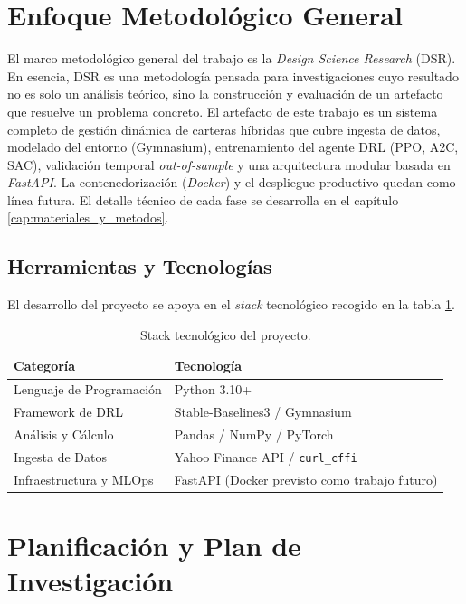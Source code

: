 \documentclass[IB,a4paper]{TFUOC}
\begin{document}

\section{Enfoque Metodológico General}
\label{sec:enfoque_metodologico}

El marco metodológico general del trabajo es la \textit{Design Science Research} (DSR). En esencia, DSR es una metodología pensada para investigaciones cuyo resultado no es solo un análisis teórico, sino la construcción y evaluación de un artefacto que resuelve un problema concreto. El artefacto de este trabajo es un sistema completo de gestión dinámica de carteras híbridas que cubre ingesta de datos, modelado del entorno (Gymnasium), entrenamiento del agente DRL (PPO, A2C, SAC), validación temporal \textit{out-of-sample} y una arquitectura modular basada en \textit{FastAPI}. La contenedorización (\textit{Docker}) y el despliegue productivo quedan como línea futura. El detalle técnico de cada fase se desarrolla en el capítulo \ref{cap:materiales_y_metodos}.

\subsection{Herramientas y Tecnologías}
El desarrollo del proyecto se apoya en el \textit{stack} tecnológico recogido en la tabla \ref{tab:herramientas}.

\begin{table}[h]
\centering
\begin{tabular}{|l|p{8cm}|}
\hline
\textbf{Categoría} & \textbf{Tecnología} \\ \hline
Lenguaje de Programación & Python 3.10+ \\ \hline
Framework de DRL & Stable-Baselines3 / Gymnasium \\ \hline
Análisis y Cálculo & Pandas / NumPy / PyTorch \\ \hline
Ingesta de Datos & Yahoo Finance API / \texttt{curl\_cffi} \\ \hline
Infraestructura y MLOps & FastAPI (Docker previsto como trabajo futuro) \\ \hline
\end{tabular}
\caption{Stack tecnológico del proyecto.}
\label{tab:herramientas}
\end{table}

\section{Planificación y Plan de Investigación}
\end{document}
